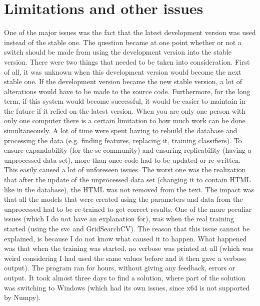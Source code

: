 \clearpage
\section{Limitations and other issues}
\label{sec:limitations_and_issues}
One of the major issues was the fact that the latest development version was used instead of the stable one.
The question became at one point whether or not a switch should be made from using the development version into the stable version.
There were two things that needed to be taken into consideration. 
First of all, it was unknown when this development version would become the next stable one.
If the development version became the new stable version, a lot of alterations would have to be made to the source code.
Furthermore, for the long term, if this system would become successful, it would be easier to maintain in the future if it relied on the latest version.
\vspace{0.5em}\newline
{}
When you are only one person with only one computer there is a certain limitation to how much work can be done simultaneously.
A lot of time were spent having to rebuild the database and processing the data (e.g. finding features, replacing it, training classifiers).
To ensure expandability (for the \gls{se} community) and ensuring replicability (having a unprocessed data set), more than once code had to be updated or re-written. 
This easily caused a lot of unforeseen issues.
The worst one was the realization that after the update of the unprocessed data set (changing it to contain HTML like in the database), the HTML was not removed from the text.
The impact was that all the models that were created using the parameters and data from the unprocessed had to be re-trained to get correct results. 
\vspace{0.5em}\newline
One of the more peculiar issues (which I do not have an explanation for), was when the real training started (using the \gls{svc} and GridSearchCV).
The reason that this issue cannot be explained, is because I do not know what caused it to happen.
What happened was that when the training was started, no verbose was printed at all (which was weird considering I had used the same values before and it then gave a verbose output). 
The program ran for hours, without giving any feedback, errors or output. 
\vspace{0.5em}\newline
It took almost three days to find a solution, where part of the solution was switching to Windows (which had its own issues, since x64 is not supported by Numpy).

